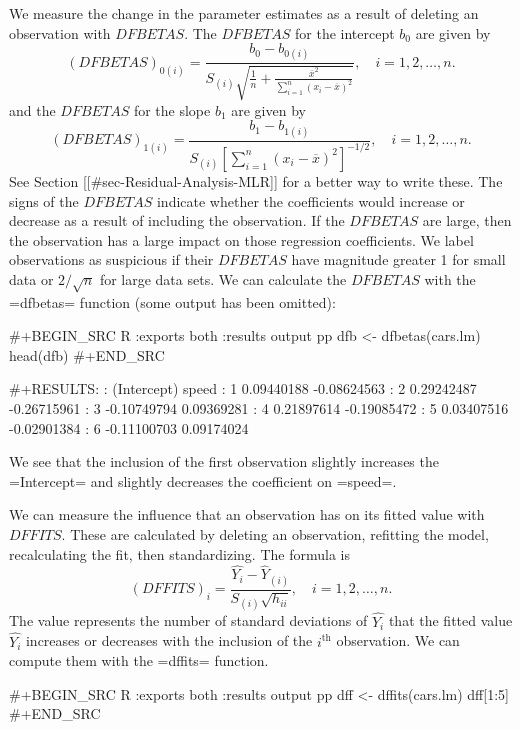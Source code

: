 We measure the change in the parameter estimates as a result of
deleting an observation with \(DFBETAS\). The \(DFBETAS\) for the
intercept \(b_{0}\) are given by
\begin{equation}
(DFBETAS)_{0(i)}=\frac{b_{0}-b_{0(i)}}{S_{(i)}\sqrt{\frac{1}{n}+\frac{\overline{x}^{2}}{\sum_{i=1}^{n}(x_{i}-\overline{x})^{2}}}},\quad i=1,2,\ldots,n.
\end{equation}
and the \(DFBETAS\) for the slope \(b_{1}\) are given by
\begin{equation}
(DFBETAS)_{1(i)}=\frac{b_{1}-b_{1(i)}}{S_{(i)}\left[\sum_{i=1}^{n}(x_{i}-\overline{x})^{2}\right]^{-1/2}},\quad i=1,2,\ldots,n.
\end{equation}
See Section [[#sec-Residual-Analysis-MLR]] for a better way to write these. The
signs of the \(DFBETAS\) indicate whether the coefficients would
increase or decrease as a result of including the observation. If the
\(DFBETAS\) are large, then the observation has a large impact on
those regression coefficients. We label observations as suspicious if
their \(DFBETAS\) have magnitude greater 1 for small data or
\(2/\sqrt{n}\) for large data sets.  We can calculate the \(DFBETAS\)
with the =dfbetas= function (some output has been omitted):

#+BEGIN_SRC R :exports both :results output pp 
dfb <- dfbetas(cars.lm)
head(dfb)
#+END_SRC

#+RESULTS:
:   (Intercept)       speed
: 1  0.09440188 -0.08624563
: 2  0.29242487 -0.26715961
: 3 -0.10749794  0.09369281
: 4  0.21897614 -0.19085472
: 5  0.03407516 -0.02901384
: 6 -0.11100703  0.09174024

We see that the inclusion of the first observation slightly increases
the =Intercept= and slightly decreases the coefficient on =speed=.

We can measure the influence that an observation has on its fitted
value with \(DFFITS\). These are calculated by deleting an
observation, refitting the model, recalculating the fit, then
standardizing. The formula is
\begin{equation}
(DFFITS)_{i}=\frac{\hat{Y_{i}}-\hat{Y}_{(i)}}{S_{(i)}\sqrt{h_{ii}}},\quad i=1,2,\ldots,n.
\end{equation}
The value represents the number of standard deviations of
\(\hat{Y_{i}}\) that the fitted value \(\hat{Y_{i}}\) increases or
decreases with the inclusion of the \(i^{\textrm{th}}\)
observation. We can compute them with the =dffits= function.

#+BEGIN_SRC R :exports both :results output pp
dff <- dffits(cars.lm)
dff[1:5]
#+END_SRC

